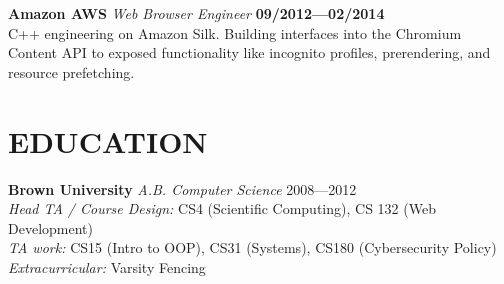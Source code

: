 \documentclass[line,margin]{res}
\begin{document}
\begin{resume}
    \textbf{Amazon AWS} {\sl Web Browser Engineer} \hfill \textbf{09/2012—02/2014} \\
    C++ engineering on Amazon Silk. Building interfaces into the Chromium Content API to exposed functionality like incognito profiles, prerendering, and resource prefetching.

\section{EDUCATION}
    \textbf{Brown University} {\sl A.B. Computer Science} \hfill 2008—2012 \\
    {\sl Head TA / Course Design:} CS4 (Scientific Computing), CS 132 (Web Development)\\
    {\sl TA work:} CS15 (Intro to OOP), CS31 (Systems), CS180 (Cybersecurity Policy)\\
    {\sl Extracurricular:} Varsity Fencing

\end{resume}
\end{document}
